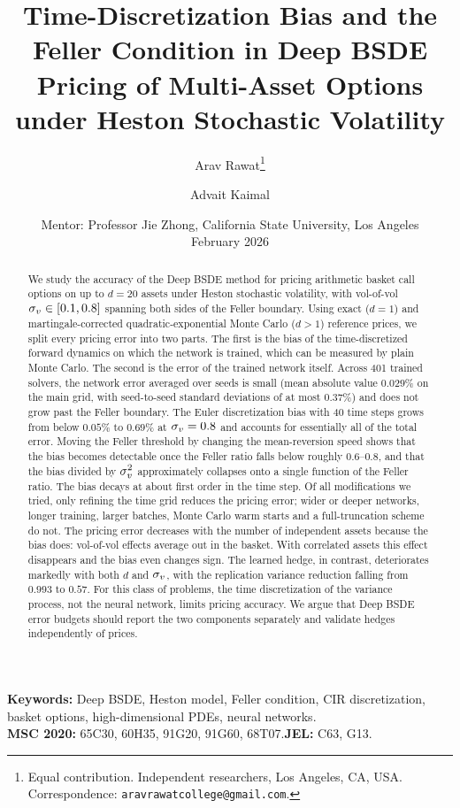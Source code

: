 

\title{Time-Discretization Bias and the Feller Condition in Deep BSDE\\ Pricing of Multi-Asset Options under Heston Stochastic Volatility}
\author{Arav Rawat\thanks{Equal contribution. Independent researchers, Los Angeles, CA, USA. Correspondence: \texttt{aravrawatcollege@gmail.com}.} \and Advait Kaimal\footnotemark[1]}
\date{Mentor: Professor Jie Zhong, California State University, Los Angeles\\[4pt] February 2026}

\maketitle
\begin{abstract}
We study the accuracy of the Deep BSDE method for pricing arithmetic basket call options on up to $d=20$ assets under Heston stochastic volatility, with vol-of-vol $\sigma_v\in[0.1,0.8]$ spanning both sides of the Feller boundary. Using exact ($d=1$) and martingale-corrected quadratic-exponential Monte Carlo ($d>1$) reference prices, we split every pricing error into two parts. The first is the bias of the time-discretized forward dynamics on which the network is trained, which can be measured by plain Monte Carlo. The second is the error of the trained network itself. Across 401 trained solvers, the network error averaged over seeds is small (mean absolute value $0.029\%$ on the main grid, with seed-to-seed standard deviations of at most $0.37\%$) and does not grow past the Feller boundary. The Euler discretization bias with 40 time steps grows from below $0.05\%$ to $0.69\%$ at $\sigma_v=0.8$ and accounts for essentially all of the total error. Moving the Feller threshold by changing the mean-reversion speed shows that the bias becomes detectable once the Feller ratio falls below roughly $0.6$--$0.8$, and that the bias divided by $\sigma_v^2$ approximately collapses onto a single function of the Feller ratio. The bias decays at about first order in the time step. Of all modifications we tried, only refining the time grid reduces the pricing error; wider or deeper networks, longer training, larger batches, Monte Carlo warm starts and a full-truncation scheme do not. The pricing error decreases with the number of independent assets because the bias does: vol-of-vol effects average out in the basket. With correlated assets this effect disappears and the bias even changes sign. The learned hedge, in contrast, deteriorates markedly with both $d$ and $\sigma_v$, with the replication variance reduction falling from $0.993$ to $0.57$. For this class of problems, the time discretization of the variance process, not the neural network, limits pricing accuracy. We argue that Deep BSDE error budgets should report the two components separately and validate hedges independently of prices.
\end{abstract}
\noindent\textbf{Keywords:} Deep BSDE, Heston model, Feller condition, CIR discretization, basket options, high-dimensional PDEs, neural networks.\\[2pt]
\noindent\textbf{MSC 2020:} 65C30, 60H35, 91G20, 91G60, 68T07.\quad \textbf{JEL:} C63, G13.


